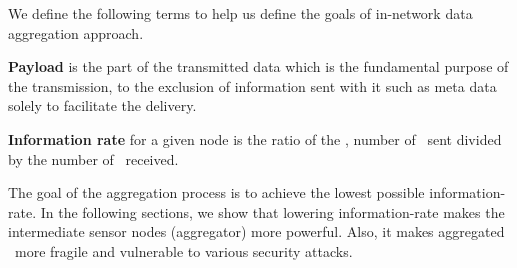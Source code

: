 	We define the following terms to help us define the goals of in-network data aggregation approach.
	\begin{definition}\label{def:payload}\cite{PayloadWiKi}
		\textbf{Payload} is the part of the transmitted data which is the fundamental purpose of the transmission, to the exclusion of information sent with it such as meta data solely to facilitate the delivery.
	\end{definition}
	\begin{definition}\label{def:information-rate}
		\textbf{Information rate} for a given node is the ratio of the \payloads, number of \payloads\ sent divided by the number of \payloads\ received.
	\end{definition}
	The goal of the aggregation process is to achieve the lowest possible information-rate.
	In the following sections, we show that lowering information-rate makes the intermediate sensor nodes (aggregator) more powerful.
	Also, it makes aggregated \payload\ more fragile and vulnerable to various security attacks.


